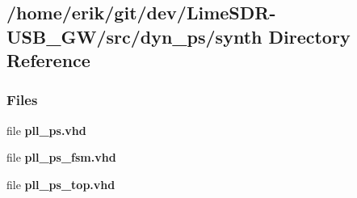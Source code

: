 \subsection{/home/erik/git/dev/\+Lime\+S\+D\+R-\/\+U\+S\+B\+\_\+\+G\+W/src/dyn\+\_\+ps/synth Directory Reference}
\label{dir_3ac24e7e01dc3243b78b96cb19501465}
\subsubsection*{Files}
\begin{DoxyCompactItemize}
\item 
file {\bf pll\+\_\+ps.\+vhd}
\item 
file {\bf pll\+\_\+ps\+\_\+fsm.\+vhd}
\item 
file {\bf pll\+\_\+ps\+\_\+top.\+vhd}
\end{DoxyCompactItemize}
